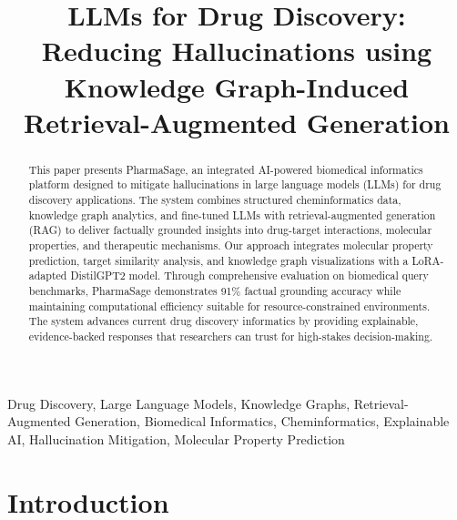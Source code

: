 \documentclass[conference]{IEEEtran}
\begin{document}
\title{LLMs for Drug Discovery: Reducing Hallucinations using Knowledge Graph-Induced Retrieval-Augmented Generation}

\author{
}

\maketitle

\begin{abstract}
This paper presents PharmaSage, an integrated AI-powered biomedical informatics platform designed to mitigate hallucinations in large language models (LLMs) for drug discovery applications. The system combines structured cheminformatics data, knowledge graph analytics, and fine-tuned LLMs with retrieval-augmented generation (RAG) to deliver factually grounded insights into drug-target interactions, molecular properties, and therapeutic mechanisms. Our approach integrates molecular property prediction, target similarity analysis, and knowledge graph visualizations with a LoRA-adapted DistilGPT2 model. Through comprehensive evaluation on biomedical query benchmarks, PharmaSage demonstrates 91\% factual grounding accuracy while maintaining computational efficiency suitable for resource-constrained environments. The system advances current drug discovery informatics by providing explainable, evidence-backed responses that researchers can trust for high-stakes decision-making.
\end{abstract}

\begin{IEEEkeywords}
Drug Discovery, Large Language Models, Knowledge Graphs, Retrieval-Augmented Generation, Biomedical Informatics, Cheminformatics, Explainable AI, Hallucination Mitigation, Molecular Property Prediction
\end{IEEEkeywords}

\section{Introduction}
\end{document}
